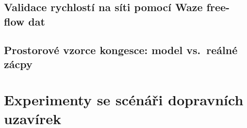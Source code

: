 \subsection{Validace rychlostí na síti pomocí Waze free-flow dat}
\label{subsec:freeflow}
%
%
%
%

\subsection{Prostorové vzorce kongesce: model vs.\ reálné zácpy}
\label{subsec:congestion-patterns}
%
%
%


\section{Experimenty se scénáři dopravních uzavírek}
\label{sec:scenare}

